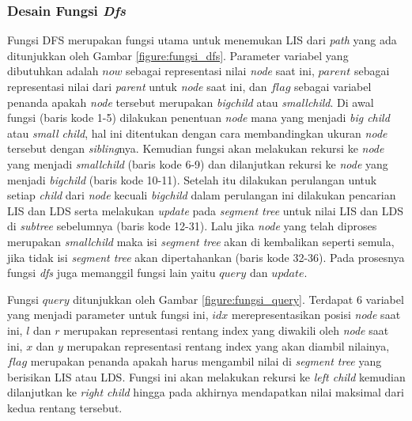 	\subsubsection{\quad Desain Fungsi \textit{Dfs}}
	\quad Fungsi DFS merupakan fungsi utama untuk menemukan LIS dari \textit{path} yang ada ditunjukkan oleh Gambar \ref{figure:fungsi_dfs}. Parameter variabel yang dibutuhkan adalah $now$ sebagai representasi nilai \textit{node} saat ini, $parent$ sebagai representasi nilai dari \textit{parent} untuk \textit{node} saat ini, dan $flag$ sebagai variabel penanda apakah \textit{node} tersebut merupakan \textit{bigchild} atau \textit{smallchild}. Di awal fungsi (baris kode 1-5) dilakukan penentuan \textit{node} mana yang menjadi \textit{big child} atau \textit{small child}, hal ini ditentukan dengan cara membandingkan ukuran \textit{node} tersebut dengan \textit{sibling}nya. Kemudian fungsi akan melakukan rekursi ke \textit{node} yang menjadi \textit{smallchild} (baris kode 6-9) dan dilanjutkan rekursi ke \textit{node} yang menjadi \textit{bigchild} (baris kode 10-11). Setelah itu dilakukan perulangan untuk setiap \textit{child} dari \textit{node} kecuali \textit{bigchild} dalam perulangan ini dilakukan pencarian LIS dan LDS serta melakukan \textit{update} pada \textit{segment tree} untuk nilai LIS dan LDS di \textit{subtree} sebelumnya (baris kode 12-31). Lalu jika \textit{node} yang telah diproses merupakan \textit{smallchild} maka isi \textit{segment tree} akan di kembalikan seperti semula, jika tidak isi \textit{segment tree} akan dipertahankan (baris kode 32-36). Pada prosesnya fungsi \textit{dfs} juga memanggil fungsi lain yaitu $query$ dan $update$.
	 
	\quad Fungsi $query$ ditunjukkan oleh Gambar \ref{figure:fungsi_query}. Terdapat 6 variabel yang menjadi parameter untuk fungsi ini, $idx$ merepresentasikan posisi \textit{node} saat ini, $l$ dan $r$ merupakan representasi rentang index yang diwakili oleh \textit{node} saat ini, $x$ dan $y$ merupakan representasi rentang index yang akan diambil nilainya, $flag$ merupakan penanda apakah harus mengambil nilai di \textit{segment tree} yang berisikan LIS atau LDS. Fungsi ini akan melakukan rekursi ke \textit{left child} kemudian dilanjutkan ke \textit{right child} hingga pada akhirnya mendapatkan nilai maksimal dari kedua rentang tersebut.
	 
